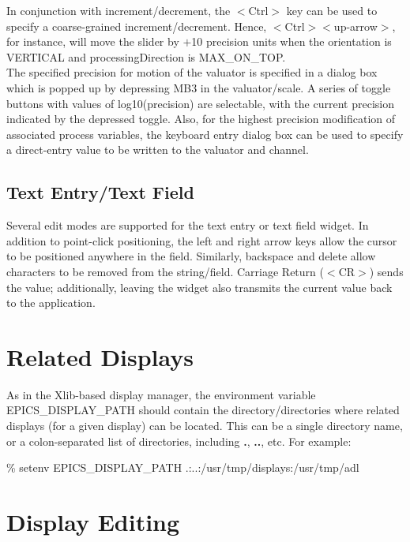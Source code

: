 \noindent In conjunction with increment/decrement, the $<$Ctrl$>$ key can be
used to specify a coarse-grained increment/decrement.  Hence,
$<$Ctrl$>$$<$up-arrow$>$,
for instance, will move the slider by $+$10 precision units when the orientation
is VERTICAL and processingDirection is MAX\_ON\_TOP.\\

\noindent The specified precision for motion of the valuator is specified in a
dialog box which is popped up by depressing MB3 in the valuator/scale. A series
of toggle buttons with values of log10(precision) are selectable, with
the current precision indicated by the depressed toggle.
Also, for the highest precision modification of associated process variables,
the keyboard entry dialog box can be used to specify a direct-entry
value to be written to the valuator and channel.\\



\subsection{Text Entry/Text Field}

Several edit modes are supported for the text entry or text field widget.
In addition to point-click positioning, the left and right arrow keys
allow the cursor to be positioned anywhere in the field. Similarly, backspace
and delete allow characters to be removed from the string/field.  Carriage
Return ($<$CR$>$) sends the value;  additionally, leaving the widget also 
transmits the current value back to the application.\\

\section{Related Displays}

As in the Xlib-based display manager, the environment variable
EPICS\_DISPLAY\_PATH should contain the directory/directories where
related displays (for a given display) can be located. This can
be a single directory name, or a colon-separated list of directories,
including {\bf .}, {\bf ..}, etc.  For example:

\% setenv EPICS\_DISPLAY\_PATH .:..:/usr/tmp/displays:/usr/tmp/adl\\




\section{Display Editing}

